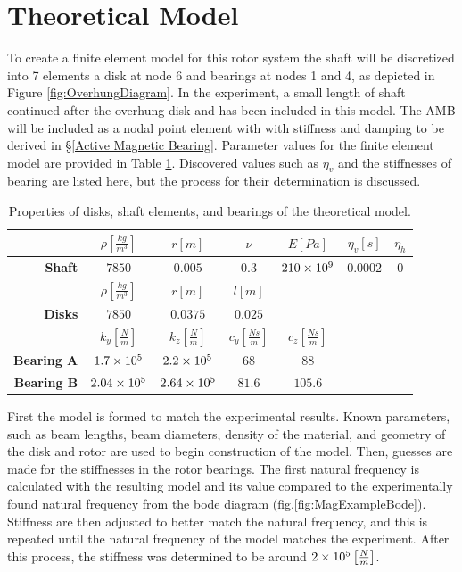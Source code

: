 \section{Theoretical Model}
To create a finite element model for this rotor system the shaft will be discretized into 7 elements a disk at node 6 and bearings at nodes 1 and 4, as depicted in Figure \ref{fig:OverhungDiagram}. In the experiment, a small length of shaft continued after the overhung disk and has been included in this model. The AMB will be included as a nodal point element with with stiffness and damping to be derived in \S\ref{Active Magnetic Bearing}. Parameter values for the finite element model are provided in Table \ref{tab:OverhungParameters}. Discovered values such as $ \eta_v $ and the stiffnesses of bearing are listed here, but the process for their determination is discussed.
\begin{table}
	\caption{Properties of disks, shaft elements, and bearings of the theoretical model.} \label{tab:MagTheoryRotorTable}
	\centering
	\label{tab:OverhungParameters}
	\begin{tabular}{rcccccc}
							&$\rho\left[\frac{kg}{m^3}\right]$	&$r[m]$					&$\nu$				&$E[Pa]$			&$ \eta_v[s] $	&$ \eta_h $	\\\hline
		\textbf{Shaft}		&$7850$					&$0.005$				&$0.3$				&$\num{210E9}$		&$ 0.0002 $		&$ 0 $		\\[-.2em]
							&$\rho\left[\frac{kg}{m^3}\right]$	&$r[m]$					&$l[m]$				&					&				&			\\\hline
		\textbf{Disks}		&$7850$					&$0.0375$				&$0.025$			&					&				&			\\[-.2em]
							&$k_y\left[\frac{N}{m}\right]$		&$k_z\left[\frac{N}{m}\right]$		&$c_y\left[\frac{Ns}{m}\right]$&$c_z\left[\frac{Ns}{m}\right]$&				&			\\\hline
		\textbf{Bearing A}	&$1.7\times 10^{5}$				&$2.2\times 10^{5}$				&$68$				&$88$				&				&			\\[-.5em]
		\textbf{Bearing B}	&$2.04\times 10^{5}$			&$2.64\times 10^{5}$			&$81.6$				&$105.6$			&				&			\\
	\end{tabular}
\end{table}
First the model is formed to match the experimental results. Known parameters, such as beam lengths, beam diameters, density of the material, and geometry of the disk and rotor are used to begin construction of the model. Then, guesses are made for the stiffnesses in the rotor bearings. The first natural frequency is calculated with the resulting model and its value compared to the experimentally found natural frequency from the bode diagram (fig.\ref{fig:MagExampleBode}). Stiffness are then adjusted to better match the natural frequency, and this is repeated until the natural frequency of the model matches the experiment. After this process, the stiffness was determined to be around $ 2\times 10^{5} \left[\frac{N}{m}\right]$.\par
